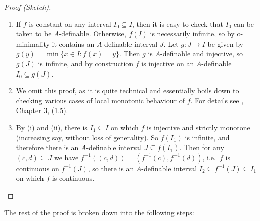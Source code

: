 \documentclass[a4paper]{report}
\newcommand{\ind}{\hspace{15pt}}
\theoremstyle{definition}
\theoremstyle{remstyle}
\begin{document}
\begin{proof}[Proof (Sketch)]\
	\begin{enumerate}[itemsep=12pt]
		\item If $f$ is constant on any interval $I_0\subseteq I$, then it is easy to check that $I_0$ can be taken to be $A$-definable. Otherwise, $f(I)$ is necessarily infinite, so by o-minimality it contains an $A$-definable interval $J$. Let $g:J\to I$ be given by $g(y)=\min\{x\in I: f(x)=y\}$. Then $g$ is $A$-definable and injective, so $g(J)$ is infinite, and by construction $f$ is injective on an $A$-definable $I_0\subseteq g(J)$.

		\item We omit this proof, as it is quite technical and essentially boils down to checking various cases of local monotonic behaviour of $f$. For details see \cite{tame}, Chapter 3, (1.5).

		\item By (i) and (ii), there is $I_1\subseteq I$ on which $f$ is injective and strictly monotone (increasing say, without loss of generality). So $f(I_1)$ is infinite, and therefore there is an $A$-definable interval $J\subseteq f(I_1)$. Then for any $(c,d)\subseteq J$ we have $f^{-1}((c,d))=(f^{-1}(c),f^{-1}(d))$, i.e.\ $f$ is continuous on $f^{-1}(J)$, so there is an $A$-definable interval $I_2\subseteq f^{-1}(J)\subseteq I_1$ on which $f$ is continuous.
	\end{enumerate}
\end{proof}

\ind The rest of the proof is broken down into the following steps:
\end{document}

